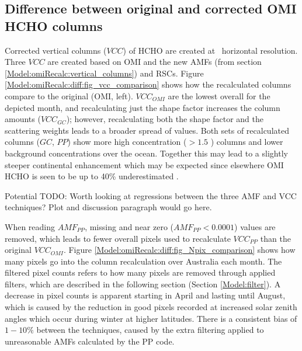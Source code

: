   \subsection{Difference between original and corrected OMI HCHO columns}
  
    
    Corrected vertical columns ($VCC$) of HCHO are created at \highhr ~horizontal resolution.
    Three $VCC$ are created based on OMI and the new AMFs (from section \ref{Model:omiRecalc:vertical_columns}) and RSCs.
    Figure \ref{Model:omiRecalc:diff:fig_vcc_comparison} shows how the recalculated columns compare to the original (OMI, left). 
    $VCC_{OMI}$ are the lowest overall for the depicted month, and recalculating just the shape factor increases the column amounts ($VCC_{GC}$); however, recalculating both the shape factor and the scattering weights leads to a broader spread of values.
    Both sets of recalculated columns ($GC$, $PP$) show more high concentration ($>1.5$ \moleccm) columns and lower background concentrations over the ocean.
    Together this may lead to a slightly steeper continental enhancement which may be expected since elsewhere OMI HCHO is seen to be up to 40\% underestimated \parencite[e.g.,][]{Zhu2016,DeSmedt2015,Barkley2013}.
    
    
    
    Potential TODO: Worth looking at regressions between the three AMF and VCC techniques? 
    Plot and discussion paragraph would go here.
    
    
    When reading $AMF_{PP}$, missing and near zero ($AMF_{PP}<0.0001$) values are removed, which leads to fewer overall pixels used to recalculate $VCC_{PP}$ than the original $VCC_{OMI}$. 
    Figure \ref{Model:omiRecalc:diff:fig_Npix_comparison} shows how many pixels go into the column recalculation over Australia each month.
    The filtered pixel counts refers to how many pixels are removed through applied filters, which are described in the following section (Section \ref{Model:filter}).
    A decrease in pixel counts is apparent starting in April and lasting until August, which is caused by the reduction in good pixels recorded at increased solar zenith angles which occur during winter at higher latitudes.
    There is a consistent bias of $1-10\%$ between the techniques, caused by the extra filtering applied to unreasonable AMFs calculated by the PP code.
    
